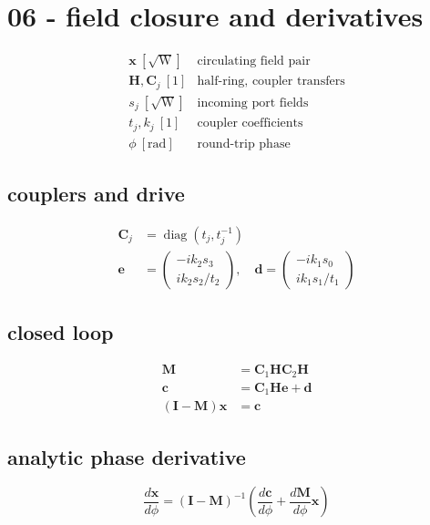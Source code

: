 \section*{06 - field closure and derivatives}

\[
\begin{array}{ll}\mathbf x\ [\sqrt{\mathrm W}]&\text{circulating field pair}\\[0.6em]\mathbf H,\mathbf C_j\ [1]&\text{half-ring, coupler transfers}\\[0.6em]s_j\ [\sqrt{\mathrm W}]&\text{incoming port fields}\\[0.6em]t_j,k_j\ [1]&\text{coupler coefficients}\\[0.6em]\phi\ [\mathrm{rad}]&\text{round-trip phase}\end{array}
\]

\subsection*{couplers and drive}
\[
\displaystyle \begin{aligned}\mathbf C_j&=\operatorname{diag}(t_j,t_j^{-1})\\\mathbf e&=\begin{pmatrix}-ik_2s_3\\ik_2s_2/t_2\end{pmatrix},\quad\mathbf d=\begin{pmatrix}-ik_1s_0\\ik_1s_1/t_1\end{pmatrix}\end{aligned}
\]

\subsection*{closed loop}
\[
\displaystyle \begin{aligned}\mathbf M&=\mathbf C_1\mathbf H\mathbf C_2\mathbf H\\\mathbf c&=\mathbf C_1\mathbf H\mathbf e+\mathbf d\\(\mathbf I-\mathbf M)\mathbf x&=\mathbf c\end{aligned}
\]

\subsection*{analytic phase derivative}
\[
\displaystyle \frac{d\mathbf x}{d\phi}=(\mathbf I-\mathbf M)^{-1}\!\left(\frac{d\mathbf c}{d\phi}+\frac{d\mathbf M}{d\phi}\mathbf x\right)
\]
